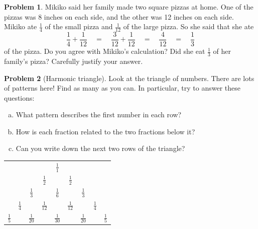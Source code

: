 \documentclass[10pt, reqno]{amsart}
\theoremstyle{remark}
\theoremstyle{definition}
\newtheorem{problem}{Problem}
\numberwithin{equation}{section}  %
\begin{document}
\begin{problem}
Mikiko said her family made two square pizzas at home.  One of the pizzas was 8 inches on each side, and the other was 12 inches on each side.  Mikiko ate $\frac 1 4$ of the small pizza and $\frac 1{12}$ of the large pizza.  So she said  that she ate 
\[
\frac 1 4 + \frac 1 {12} 
\quad 
= 
\quad 
\frac 3{12} + \frac 1 {12} 
\quad 
= 
\quad 
\frac 4{12} 
\quad 
= 
\quad 
\frac 1 3
\]
of the pizza.
Do you agree with Mikiko's calculation?  Did she eat $\frac 1 3$ of her family's pizza?  Carefully justify your answer.
\end{problem}


\begin{problem}[Harmonic triangle]
Look at the triangle of numbers.  There are lots of patterns here!  Find as many as you can.  In particular, try to answer these questions:

\begin{enumerate}[(a)]
\item
What  pattern describes the first number in each row?
\item
How is each fraction related to the two fractions below it?
\item
Can you write down the next two rows of the triangle? 
\end{enumerate}

\begin{center}
\begin{tabular}{ccccccccc}
&&&& $\displaystyle\frac 1 1$ & & & &\\
&&&$\displaystyle\frac 1 2$&  &$\displaystyle\frac 1 2$ & & &\\
&&$\displaystyle\frac 1 3$&&$\displaystyle\frac 1 6$  & &$\displaystyle\frac 1 3$ & &\\
&$\displaystyle\frac 1 4$&&$\displaystyle\frac 1 {12}$ & & $\displaystyle\frac 1 {12}$& &$\displaystyle\frac 1 4$ &\\
$\displaystyle\frac 1 5$&&$\displaystyle\frac 1 {20}$&&$\displaystyle\frac 1 {30}$  & &$\displaystyle\frac 1 {20}$ & &$\displaystyle\frac 1 5$\\
\end{tabular}
\end{center}

\end{problem}
\end{document}
